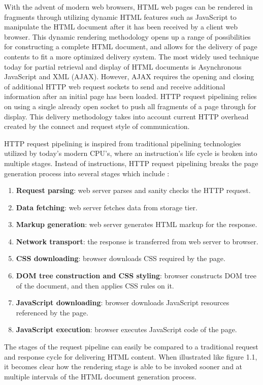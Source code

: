 \documentclass[12pt]{report}
\begin{document}
With the advent of modern web browsers, HTML web pages can be rendered in fragments through utilizing dynamic HTML features such as JavaScript to manipulate the HTML document after it has been received by a client web browser. This dynamic rendering methodology opens up a range of possibilities for constructing a complete HTML document, and allows for the delivery of page contents to fit a more optimized delivery system. The most widely used technique today for partial retrieval and display of HTML documents is Asynchronous JavaScript and XML (AJAX). However, AJAX requires the opening and closing of additional HTTP web request sockets to send and receive additional information after an initial page has been loaded. HTTP request pipelining relies on using a single already open socket to push all fragments of a page through for display. This delivery methodology takes into account current HTTP overhead created by the connect and request style of communication.

HTTP request pipelining is inspired from traditional pipelining technologies utilized by today’s modern CPU's, where an instruction's life cycle is broken into multiple stages. Instead of instructions, HTTP request pipelining breaks the page generation process into several stages which include \cite{facebookBigpipe}:

\begin{enumerate}
  \item \textbf{Request parsing}: web server parses and sanity checks the HTTP request. 
  \item \textbf{Data fetching}: web server fetches data from storage tier.
  \item \textbf{Markup generation}: web server generates HTML markup for the response. 
  \item \textbf{Network transport}: the response is transferred from web server to browser.
  \item \textbf{CSS downloading}: browser downloads CSS required by the page. 
  \item \textbf{DOM tree construction and CSS styling}: browser constructs DOM tree of the document, and then applies CSS rules on it.
  \item \textbf{JavaScript downloading}: browser downloads JavaScript resources referenced by the page.
  \item \textbf{JavaScript execution}: browser executes JavaScript code of the page.
\end{enumerate}

The stages of the request pipeline can easily be compared to a traditional request and response cycle for delivering HTML content. When illustrated like figure 1.1, it becomes clear how  the rendering stage is able to be invoked sooner and at multiple intervals of the HTML document generation process.
\end{document}
